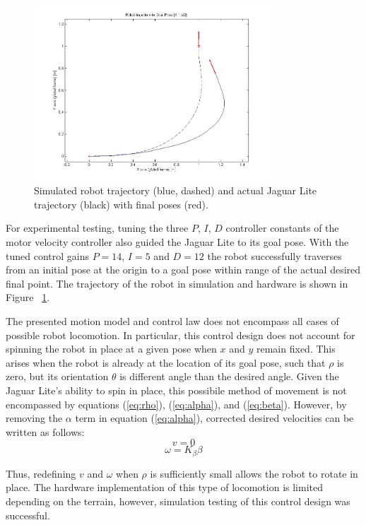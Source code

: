 \documentclass[conference]{IEEEtran}
\begin{document}
\begin{figure}[b]
\centering
\includegraphics[width = 3.5in]{trajectory.jpg}
\caption{Simulated robot trajectory (blue, dashed) and actual Jaguar Lite trajectory (black) with final poses (red).}
\label{fig4}
\end{figure}

For experimental testing, tuning the three $P$, $I$, $D$
controller constants of the motor velocity controller also guided the Jaguar Lite to its goal pose. 
With the tuned control gains $P = 14$, $I = 5$ and $D = 12$ the robot successfully traverses from an initial pose at the origin to a goal pose within range of the 
actual desired final point. The trajectory of the robot in simulation and hardware is shown in Figure ~\ref{fig4}.

The presented motion model and control law does not encompass all cases of possible robot 
locomotion. In particular, this control design does not account for spinning the robot in place at a 
given pose when $x$ and $y$ remain fixed.  This arises when the robot is already at the location 
of its goal pose, such that $\rho$ is zero, but its orientation $\theta$ is different angle than the desired angle.  Given the 
Jaguar Lite's ability to spin in place, this possibile method of movement is not encompassed by equations
 (\ref{eq:rho}), (\ref{eq:alpha}), and (\ref{eq:beta}).  
However, by removing the $\alpha$ term in equation (\ref{eq:alpha}), corrected desired velocities 
can be written as follows:
\begin{equation} 
v = 0
\end{equation}
\begin{equation}
\omega = K_{\beta} \beta 
\end{equation}

Thus, redefining $v$ and $\omega$ when $\rho$ is sufficiently small allows the robot to rotate 
in place. The hardware implementation of this type of locomotion is limited depending on the 
terrain, however, simulation testing of this control design was successful.
\end{document}
